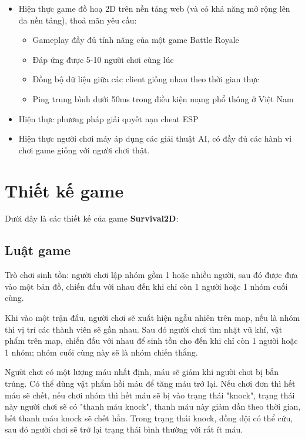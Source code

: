 \documentclass[12pt,a4paper]{article}
\begin{document}
  \begin{itemize}
      \item Hiện thực game đồ hoạ 2D trên nền tảng web (và có khả năng mở rộng lên đa nền tảng), thoả mãn yêu cầu:
        \begin{itemize}
            \item Gameplay đầy đủ tính năng của một game Battle Royale
            \item Đáp ứng được 5-10 người chơi cùng lúc
            \item Đồng bộ dữ liệu giữa các client giống nhau theo thời gian thực
            \item Ping trung bình dưới 50ms trong điều kiện mạng phổ thông ở Việt Nam
        \end{itemize}
      \item Hiện thực phương pháp giải quyết nạn cheat ESP
      \item Hiện thực người chơi máy áp dụng các giải thuật AI, có đầy đủ các hành vi chơi game giống với người chơi thật.
  \end{itemize}

\newpage
\section{Thiết kế game}
  Dưới đây là các thiết kế của game \textbf{Survival2D}:
  \subsection{Luật game}
  Trò chơi sinh tồn: người chơi lập nhóm gồm 1 hoặc nhiều người, sau đó được đưa vào một bản đồ, chiến đấu với nhau đến khi chỉ còn 1 người hoặc 1 nhóm cuối cùng.
  
  Khi vào một trận đấu, người chơi sẽ xuất hiện ngẫu nhiên trên map, nếu là nhóm thì vị trí các thành viên sẽ gần nhau. Sau đó người chơi tìm nhặt vũ khí, vật phẩm trên map, chiến đấu với nhau để sinh tồn cho đến khi chỉ còn 1 người hoặc 1 nhóm; nhóm cuối cùng này sẽ là nhóm chiến thắng.
  
  Người chơi có một lượng máu nhất định, máu sẽ giảm khi người chơi bị bắn trúng. Có thể dùng vật phẩm hồi máu để tăng máu trở lại. Nếu chơi đơn thì hết máu sẽ chết, nếu chơi nhóm thì hết máu sẽ bị vào trạng thái "knock", trạng thái này người chơi sẽ có "thanh máu knock", thanh máu này giảm dần theo thời gian, hết thanh máu knock sẽ chết hẳn. Trong trạng thái knock, đồng đội có thể cứu, sau đó người chơi sẽ trở lại trạng thái bình thường với rất ít máu.
\end{document}

